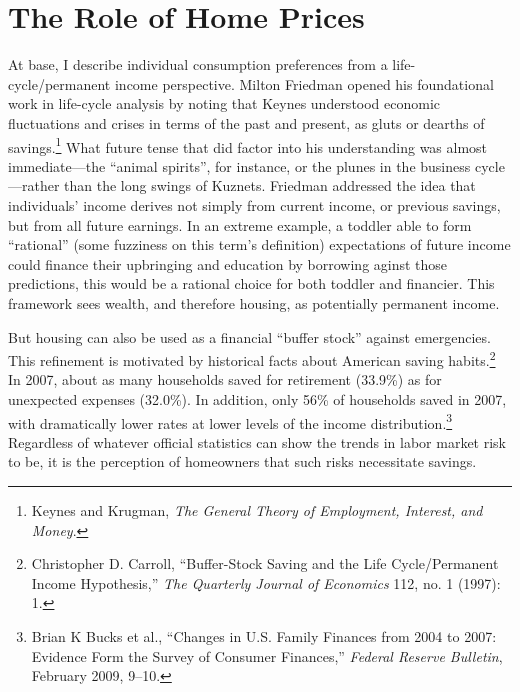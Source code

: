 \documentclass[12pt,oneside]{psthesis}
\begin{document}
\hypertarget{home-prices}{%
\section{The Role of Home Prices}\label{home-prices}}

At base, I describe individual consumption preferences from a life-cycle/permanent income perspective.
Milton Friedman opened his foundational work in life-cycle analysis by noting that Keynes understood economic fluctuations and crises in terms of the past and present, as gluts or dearths of savings.\footnote{Keynes and Krugman, \emph{The General Theory of Employment, Interest, and Money}.}
What future tense that did factor into his understanding was almost immediate---the ``animal spirits'', for instance, or the plunes in the business cycle---rather than the long swings of Kuznets.
Friedman addressed the idea that individuals' income derives not simply from current income, or previous savings, but from all future earnings.
In an extreme example, a toddler able to form ``rational'' (some fuzziness on this term's definition) expectations of future income could finance their upbringing and education by borrowing aginst those predictions, this would be a rational choice for both toddler and financier.
This framework sees wealth, and therefore housing, as potentially permanent income.

But housing can also be used as a financial ``buffer stock'' against emergencies.
This refinement is motivated by historical facts about American saving habits.\footnote{Christopher D. Carroll, ``Buffer-Stock Saving and the Life Cycle/Permanent Income Hypothesis,'' \emph{The Quarterly Journal of Economics} 112, no. 1 (1997): 1.}
In 2007, about as many households saved for retirement (33.9\%) as for unexpected expenses (32.0\%).
In addition, only 56\% of households saved in 2007, with dramatically lower rates at lower levels of the income distribution.\footnote{Brian K Bucks et al., ``Changes in U.S. Family Finances from 2004 to 2007: Evidence Form the Survey of Consumer Finances,'' \emph{Federal Reserve Bulletin}, February 2009, 9--10.}
Regardless of whatever official statistics can show the trends in labor market risk to be, it is the perception of homeowners that such risks necessitate savings.
\end{document}
